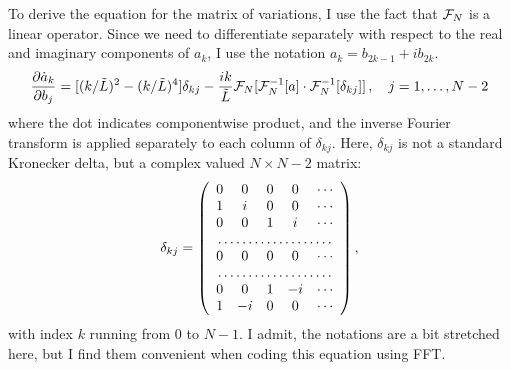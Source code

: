 {To derive the equation for the matrix of variations, I use the fact
that ${\cal F}_N$ is a linear operator.  Since we need to
differentiate separately with respect to the real and imaginary
components of $a_k$, I use the notation $a_k = b_{2k-1} + ib_{2k}$.
\begin{equation}
  \frac{\partial \dot{a}_k}{\partial b_j} =
  [(k/\tilde{L})^2-(k/\tilde{L})^4]\delta_{kj} -
  \frac{ik}{\tilde{L}}{\cal F}_N[{\cal F}_N^{-1}[a]\cdot{\cal
  F}_N^{-1}[\delta_{kj}]]\,,\quad j = 1,\ldots,N-2
\end{equation}
where the dot indicates componentwise product, and the inverse
Fourier transform is applied separately to each column of
$\delta_{kj}$. Here, $\delta_{kj}$ is not a standard Kronecker
delta, but a complex valued $N\times N-2$ matrix:
\begin{equation}
  \delta_{kj} = \left(
  \begin{array}{ccccc}
  0 &  0 & 0 &  0 &\cdots\\
  1 &  i & 0 &  0 &\cdots\\
  0 &  0 & 1 &  i &\cdots\\
\multicolumn{5}{c}\dotfill \\
  0 &  0 & 0 &  0 &\cdots\\
\multicolumn{5}{c}\dotfill \\
  0 &  0 & 1 & -i &\cdots\\
  1 & -i & 0 &  0 &\cdots\\
  \end{array}  \right),
\end{equation}
with index $k$ running from 0 to $N-1$.  I admit, the notations are
a bit stretched here, but I find them convenient when coding this
equation using FFT.



        }%
